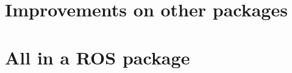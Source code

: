 \documentclass[12pt,a4paper,final,twoside,openright]{report}
\begin{document}
\section{Improvements on other packages}





\section{All in a ROS package}
\end{document}
